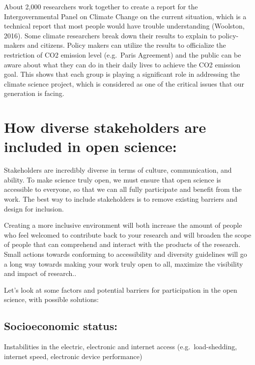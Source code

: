 \documentclass[
  letterpaper,
  DIV=11,
  numbers=noendperiod]{scrreport}
\begin{document}
About 2,000 researchers work together to create a report for the
Intergovernmental Panel on Climate Change on the current situation,
which is a technical report that most people would have trouble
understanding (Woolston, 2016). Some climate researchers break down
their results to explain to policy-makers and citizens. Policy makers
can utilize the results to officialize the restriction of CO2 emission
level (e.g.~Paris Agreement) and the public can be aware about what they
can do in their daily lives to achieve the CO2 emission goal. This shows
that each group is playing a significant role in addressing the climate
science project, which is considered as one of the critical issues that
our generation is facing.

\hypertarget{how-diverse-stakeholders-are-included-in-open-science}{%
\section{How diverse stakeholders are included in open
science:}\label{how-diverse-stakeholders-are-included-in-open-science}}

Stakeholders are incredibly diverse in terms of culture, communication,
and ability. To make science truly open, we must ensure that open
science is accessible to everyone, so that we can all fully participate
and benefit from the work. The best way to include stakeholders is to
remove existing barriers and design for inclusion.

Creating a more inclusive environment will both increase the amount of
people who feel welcomed to contribute back to your research and will
broaden the scope of people that can comprehend and interact with the
products of the research. Small actions towards conforming to
accessibility and diversity guidelines will go a long way towards making
your work truly open to all, maximize the visibility and impact of
research..

Let's look at some factors and potential barriers for participation in
the open science, with possible solutions:

\hypertarget{socioeconomic-status}{%
\subsection{Socioeconomic status:}\label{socioeconomic-status}}

Instabilities in the electric, electronic and internet access
(e.g.~load-shedding, internet speed, electronic device performance)
\end{document}
